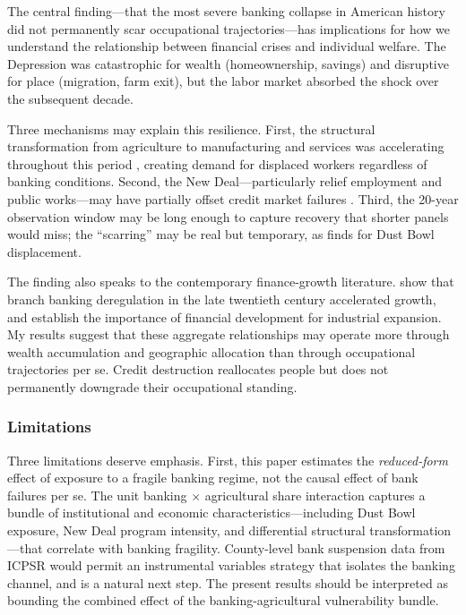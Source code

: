 \documentclass[12pt]{article}
\begin{document}
The central finding---that the most severe banking collapse in American history did not permanently scar occupational trajectories---has implications for how we understand the relationship between financial crises and individual welfare. The Depression was catastrophic for wealth (homeownership, savings) and disruptive for place (migration, farm exit), but the labor market absorbed the shock over the subsequent decade.

Three mechanisms may explain this resilience. First, the structural transformation from agriculture to manufacturing and services was accelerating throughout this period \citep{margo1993}, creating demand for displaced workers regardless of banking conditions. Second, the New Deal---particularly relief employment and public works---may have partially offset credit market failures \citep{fishback2005}. Third, the 20-year observation window may be long enough to capture recovery that shorter panels would miss; the ``scarring'' may be real but temporary, as \citet{hornbeck2012} finds for Dust Bowl displacement.

The finding also speaks to the contemporary finance-growth literature. \citet{jayaratne1996} show that branch banking deregulation in the late twentieth century accelerated growth, and \citet{rajan1998} establish the importance of financial development for industrial expansion. My results suggest that these aggregate relationships may operate more through wealth accumulation and geographic allocation than through occupational trajectories per se. Credit destruction reallocates people but does not permanently downgrade their occupational standing.

\subsubsection*{Limitations}
Three limitations deserve emphasis. First, this paper estimates the \textit{reduced-form} effect of exposure to a fragile banking regime, not the causal effect of bank failures per se. The unit banking $\times$ agricultural share interaction captures a bundle of institutional and economic characteristics---including Dust Bowl exposure, New Deal program intensity, and differential structural transformation---that correlate with banking fragility. County-level bank suspension data from ICPSR \citep{calomiris2003} would permit an instrumental variables strategy that isolates the banking channel, and is a natural next step. The present results should be interpreted as bounding the combined effect of the banking-agricultural vulnerability bundle.
\end{document}
